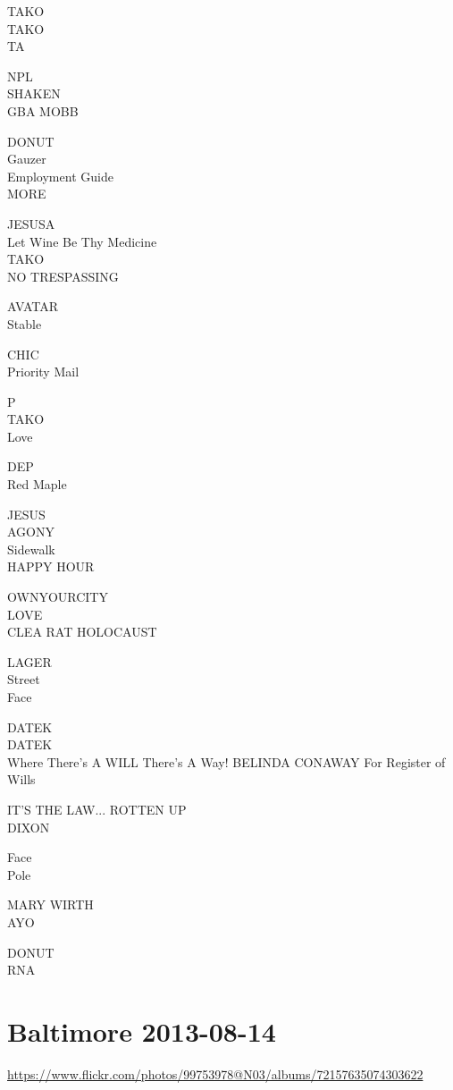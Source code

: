 \documentclass[10pt,letterpaper]{article}
\begin{document}
TAKO\\
TAKO\\
TA

NPL\\
SHAKEN\\
GBA MOBB

DONUT\\
Gauzer\\
Employment Guide\\
MORE

JESUSA\\
Let Wine Be Thy Medicine\\
TAKO\\
NO TRESPASSING

AVATAR\\
Stable

CHIC\\
Priority Mail

P\\
TAKO\\
Love

DEP\\
Red Maple

JESUS\\
AGONY\\
Sidewalk\\
HAPPY HOUR

OWNYOURCITY\\
LOVE\\
CLEA RAT HOLOCAUST

LAGER\\
Street\\
Face

DATEK\\
DATEK\\
Where There's A WILL There's A Way!  BELINDA CONAWAY For Register of Wills

IT'S THE LAW... ROTTEN UP\\
DIXON

Face\\
Pole

MARY WIRTH\\
AYO

DONUT\\
RNA
\

\section*{Baltimore 2013-08-14}

\url{https://www.flickr.com/photos/99753978@N03/albums/72157635074303622}
\end{document}
